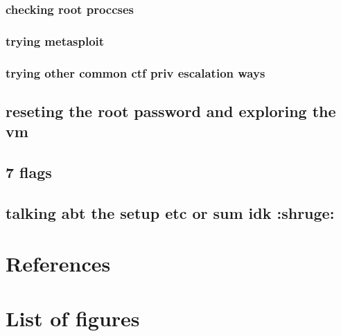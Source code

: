 \documentclass[a4paper]{article}
\begin{document}
\subsubsection{checking root proccses}
\subsubsection{trying metasploit}
\subsubsection{trying other common ctf priv escalation ways}
\subsection{reseting the root password and exploring the vm}
\subsection{7 flags}
\subsection{talking abt the setup etc or sum idk :shruge:}

\newpage
\section{References}

\newpage
\section{List of figures}

\listoffigures
\end{document}

